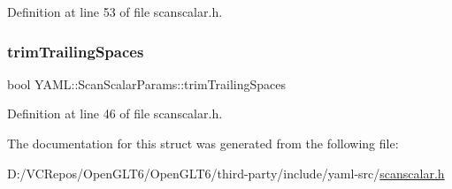Definition at line 53 of file scanscalar.\+h.

\mbox{\label{struct_y_a_m_l_1_1_scan_scalar_params_ad48fca62e46d2f1cefa11cb7f4490939}} 
\subsubsection{\texorpdfstring{trimTrailingSpaces}{trimTrailingSpaces}}
{\footnotesize\ttfamily bool Y\+A\+M\+L\+::\+Scan\+Scalar\+Params\+::trim\+Trailing\+Spaces}



Definition at line 46 of file scanscalar.\+h.



The documentation for this struct was generated from the following file\+:\begin{DoxyCompactItemize}
\item 
D\+:/\+V\+C\+Repos/\+Open\+G\+L\+T6/\+Open\+G\+L\+T6/third-\/party/include/yaml-\/src/\mbox{\hyperlink{scanscalar_8h}{scanscalar.\+h}}\end{DoxyCompactItemize}
